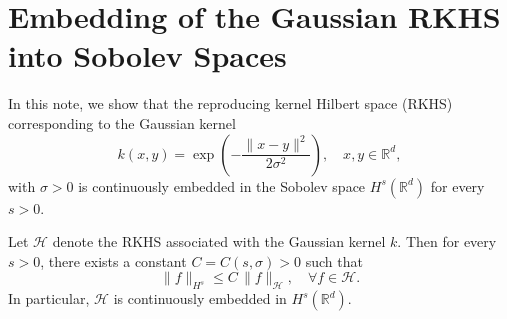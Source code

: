 




\iffalse

\section*{Embedding of the Gaussian RKHS into Sobolev Spaces}

In this note, we show that the reproducing kernel Hilbert space (RKHS) corresponding to the Gaussian kernel
\[
k(x,y)=\exp\left(-\frac{\|x-y\|^2}{2\sigma^2}\right),\quad x,y\in\mathbb{R}^d,
\]
with \(\sigma>0\) is continuously embedded in the Sobolev space \(H^s(\mathbb{R}^d)\) for every \(s>0\).

\begin{theorem}
Let \(\mathcal{H}\) denote the RKHS associated with the Gaussian kernel \(k\). Then for every \(s>0\), there exists a constant \(C=C(s,\sigma)>0\) such that
\[
\|f\|_{H^s} \le C\,\|f\|_{\mathcal{H}}, \quad \forall f\in \mathcal{H}.
\]
In particular, \(\mathcal{H}\) is continuously embedded in \(H^s(\mathbb{R}^d)\).
\end{theorem}

